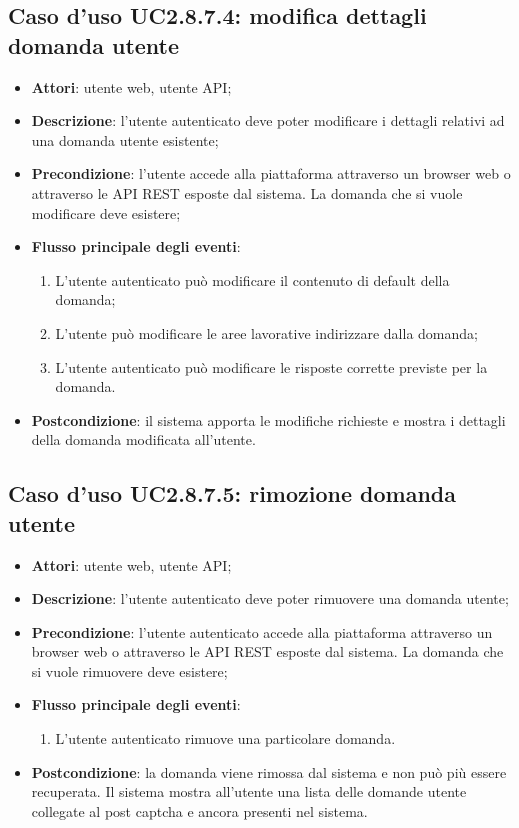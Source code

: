 \subsection{Caso d'uso UC2.8.7.4: modifica dettagli domanda utente}
\begin{itemize}
\item \textbf{Attori}: utente web, utente API;
\item \textbf{Descrizione}: l'utente autenticato deve poter modificare i dettagli relativi ad una domanda utente esistente; 
      \item \textbf{Precondizione}: l'utente accede alla piattaforma attraverso un browser web o attraverso le API REST esposte dal sistema. La domanda che si vuole modificare deve esistere;

        \item \textbf{Flusso principale degli eventi}:
          \begin{enumerate}
          \item L'utente autenticato può modificare il contenuto di default della domanda;
          \item L'utente può modificare le aree lavorative indirizzare dalla domanda;
          \item L'utente autenticato può modificare le risposte corrette previste per la domanda.

      \end{enumerate}
    \item \textbf{Postcondizione}: il sistema apporta le modifiche richieste e mostra i dettagli della domanda modificata all'utente.
  \end{itemize}
\hypertarget{UC2.8.7.5}{}
\subsection{Caso d'uso UC2.8.7.5: rimozione domanda utente}
\begin{itemize}
\item \textbf{Attori}: utente web, utente API;
\item \textbf{Descrizione}: l'utente autenticato deve poter rimuovere una domanda utente; 
      \item \textbf{Precondizione}: l'utente autenticato accede alla piattaforma attraverso un browser web o attraverso le API REST esposte dal sistema. La domanda che si vuole rimuovere deve esistere;

        \item \textbf{Flusso principale degli eventi}:
          \begin{enumerate}
          \item L'utente autenticato rimuove una particolare domanda.

      \end{enumerate}
    \item \textbf{Postcondizione}: la domanda viene rimossa dal sistema e non può più essere recuperata. Il sistema mostra all'utente una lista delle domande utente collegate al post captcha e ancora presenti nel sistema.
  \end{itemize}
\hypertarget{UC2.8.7.6}{}
